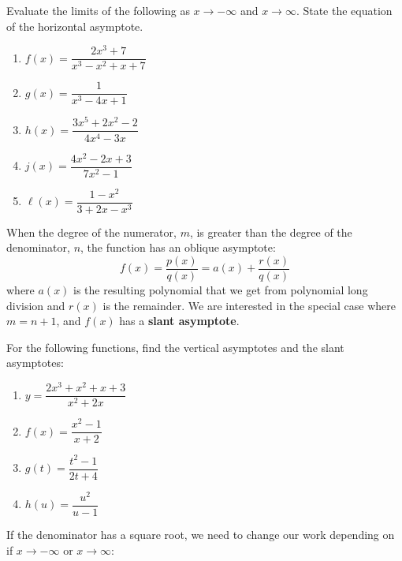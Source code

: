 \documentclass[mathNotesPreamble]{subfiles}
\begin{document}
      \begin{ex*}
        Evaluate the limits of the following as $x\to-\infty$ and $x\to\infty$. State the equation of the horizontal asymptote.
        \begin{enumerate}
          \item $f(x)=\dfrac{2x^3+7}{x^3-x^2+x+7}$
          \item $g(x)=\dfrac{1}{x^3-4x+1}$
          \item $h(x)=\dfrac{3x^5+2x^2-2}{4x^4-3x}$
          \item $j(x)=\dfrac{4x^2-2x+3}{7x^2-1}$
          \item $\ell(x)=\dfrac{1-x^2}{3+2x-x^3}$
        \end{enumerate}
      \end{ex*}
      \pagebreak
      
      \begin{defn*}
      When the degree of the numerator, $m$, is greater than the degree of the denominator, $n$, the function has an oblique asymptote:
        $$f(x)=\dfrac{p(x)}{q(x)}=a(x)+\dfrac{r(x)}{q(x)}$$
      where $a(x)$ is the resulting polynomial that we get from polynomial long division and $r(x)$ is the remainder. We are interested in the special case where $m=n+1$, and $f(x)$ has a \textbf{slant asymptote}.
      \end{defn*}
      \begin{ex*}
        For the following functions, find the vertical asymptotes and the slant asymptotes:
      \end{ex*}
      \begin{enumerate}[itemsep=\stretch{1}]
        \item $y=\dfrac{2x^3+x^2+x+3}{x^2+2x}$
        \item $f(x)=\dfrac{x^2-1}{x+2}$
      \end{enumerate}
      \pagebreak
      \begin{enumerate}[itemsep=\stretch{1}]
        \setcounter{enumi}{2}
        \item $g(t)=\dfrac{t^2-1}{2t+4}$
        \item $h(u)=\dfrac{u^2}{u-1}$
      \end{enumerate}
      \pagebreak
      If the denominator has a square root, we need to change our work depending on if $x\to-\infty$ or $x\to\infty$:\\
      
\end{document}
